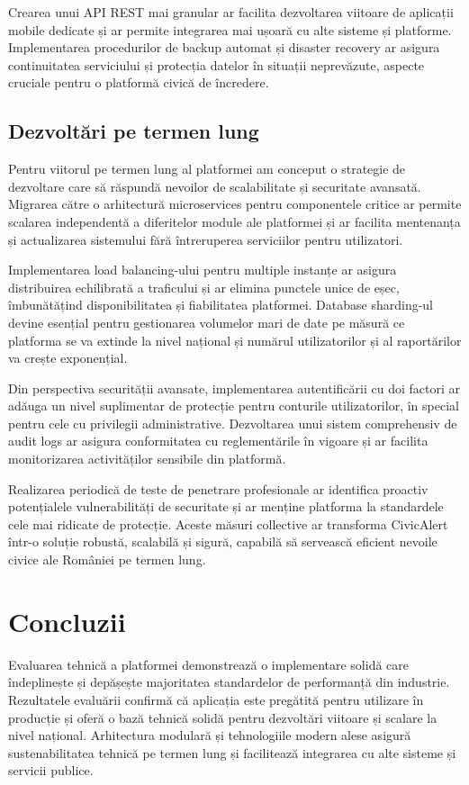 \documentclass[12pt,a4paper]{report}
\begin{document}
Crearea unui API REST mai granular ar facilita dezvoltarea viitoare de aplicații mobile dedicate și ar permite integrarea mai ușoară cu alte sisteme și platforme. Implementarea procedurilor de backup automat și disaster recovery ar asigura continuitatea serviciului și protecția datelor în situații neprevăzute, aspecte cruciale pentru o platformă civică de încredere.
\subsection{Dezvoltări pe termen lung}
Pentru viitorul pe termen lung al platformei am conceput o strategie de dezvoltare care să răspundă nevoilor de scalabilitate și securitate avansată. Migrarea către o arhitectură microservices pentru componentele critice ar permite scalarea independentă a diferitelor module ale platformei și ar facilita mentenanța și actualizarea sistemului fără întreruperea serviciilor pentru utilizatori.

Implementarea load balancing-ului pentru multiple instanțe ar asigura distribuirea echilibrată a traficului și ar elimina punctele unice de eșec, îmbunătățind disponibilitatea și fiabilitatea platformei. Database sharding-ul devine esențial pentru gestionarea volumelor mari de date pe măsură ce platforma se va extinde la nivel național și numărul utilizatorilor și al raportărilor va crește exponențial.

Din perspectiva securității avansate, implementarea autentificării cu doi factori ar adăuga un nivel suplimentar de protecție pentru conturile utilizatorilor, în special pentru cele cu privilegii administrative. Dezvoltarea unui sistem comprehensiv de audit logs ar asigura conformitatea cu reglementările în vigoare și ar facilita monitorizarea activităților sensibile din platformă.

Realizarea periodică de teste de penetrare profesionale ar identifica proactiv potențialele vulnerabilități de securitate și ar menține platforma la standardele cele mai ridicate de protecție. Aceste măsuri collective ar transforma CivicAlert într-o soluție robustă, scalabilă și sigură, capabilă să servească eficient nevoile civice ale României pe termen lung.

\section{Concluzii}

Evaluarea tehnică a platformei  demonstrează o implementare solidă care îndeplinește și depășește majoritatea standardelor de performanță din industrie.
Rezultatele evaluării confirmă că aplicația este pregătită pentru utilizare în producție și oferă o bază tehnică solidă pentru dezvoltări viitoare și scalare la nivel național.
Arhitectura modulară și tehnologiile modern alese   asigură sustenabilitatea tehnică pe termen lung și facilitează integrarea cu alte sisteme și servicii publice.
\end{document}
